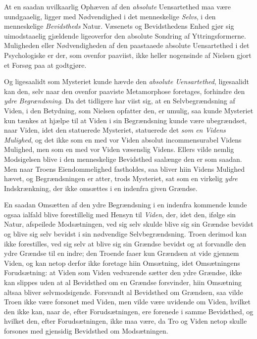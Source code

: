 \documentclass[12pt,a4paper]{book}
\newcommand{\opage}[1]{\marginnote{\footnotesize\textit{[#1]}}}
\begin{document}
At en saadan uvilkaarlig Ophæven af den \emph{absolute} Uensartethed maa være uundgaaelig,
ligger med Nødvendighed i det menneskelige \emph{Selvs}, i den menneskelige \emph{Bevidstheds} Natur. Væsenets og Bevidsthedens Enhed gjør sig uimodstaaelig gjældende ligeoverfor den
absolute Sondring af Yttringsformerne. Muligheden eller Nødvendigheden af den paastaaede
absolute Uensartethed i det Psychologiske er der, som ovenfor paaviist, ikke heller nogensinde
af Nielsen gjort et Forsøg paa at godtgjøre.

Og ligesaalidt som Mysteriet kunde hævde den \emph{abso\opage{186}lute Uensartethed}, ligesaalidt kan den, selv
naar den ovenfor paaviste Metamorphose foretages, forhindre den \emph{ydre Begrændsning}. Da
det tidligere har viist sig, at en Selvbegrændsning af Viden, i den Betydning, som Nielsen
opfatter den, er umulig, saa kunde Mysteriet kun tænkes at hjælpe til at Viden i sin
Begrændsning kunde være ubegrændset, naar Viden, idet den statuerede Mysteriet, statuerede det
\emph{som en Videns Mulighed}, og det ikke som en med vor Viden absolut incommensurabel Videns
Mulighed, men som en med vor Viden væsenslig Videns. Ellers vilde nemlig Modsigelsen
blive i den menneskelige Bevidsthed saalænge den er som saadan. Men naar Troens
Eiendommelighed fastholdes, saa bliver hiin Videns Mulighed hævet, og Begrændsningen er atter,
trods Mysteriet, sat som en virkelig \emph{ydre} Indskrænkning, der ikke omsættes i en indenfra
given Grændse.

En saadan Omsætten af den ydre Begrændsning i en indenfra kommende kunde ogsaa ialfald blive
forestillelig med Hensyn til \emph{Viden}, der, idet den, ifølge sin Natur, afspeilede Modsætningen,
ved sig selv skulde blive sig sin Grændse bevidst og blive sig selv bevidst i sin nødvendige
Selvbegrændsning. Troen derimod kan ikke forestilles, ved sig selv at blive sig sin Grændse
bevidst og at forvandle den ydre Grændse til en indre; den Troende faaer kun Grændsen at vide
gjennem Viden, og kan netop derfor ikke foretage hiin Omsætning, idet Omsætningens
Forudsætning: at Viden som Viden vedvarende sætter den ydre Grændse, ikke kan slippes uden at
al Bevidsthed om en Grændse forsvinder, hiin Omsætning altsaa bliver selvmodsigende. Forsvandt
al Bevidsthed om Grændsen, saa vilde Troen ikke være forsonet med Viden, men vilde være
uvidende om Viden, hvilket den ikke kan, naar de, efter Forudsætningen, ere forenede i samme
Bevidsthed, og hvilket den, efter Forudsætningen, ikke maa være, da Tro og Viden netop skulle
forsones med gjensidig Bevidsthed om Modsætningen.
\end{document}
